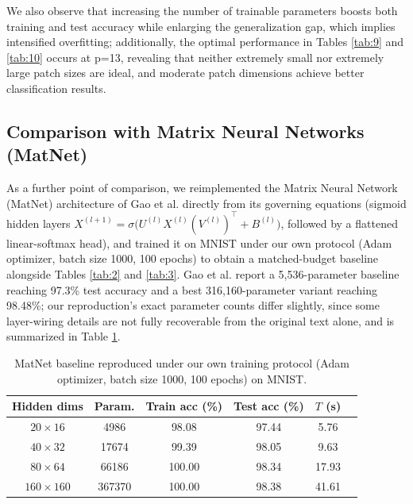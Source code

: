 \documentclass[pdflatex,sn-mathphys-num]{sn-jnl}%
\theoremstyle{thmstyleone}%
\theoremstyle{thmstyletwo}%
\theoremstyle{thmstylethree}%
\begin{document}
We also observe that increasing the number of trainable parameters boosts both training and test accuracy while enlarging the generalization gap, which implies intensified overfitting; additionally, the optimal performance in Tables \ref{tab:9} and \ref{tab:10} occurs at p=13, revealing that neither extremely small nor extremely large patch sizes are ideal, and moderate patch dimensions achieve better classification results.




\subsection{Comparison with Matrix Neural Networks (MatNet)}
As a further point of comparison, we reimplemented the Matrix Neural Network (MatNet) architecture of Gao et al. \cite{Gao2017MatNet} directly from its governing equations (sigmoid hidden layers $X^{(l+1)}=\sigma\big(U^{(l)}X^{(l)}(V^{(l)})^\top+B^{(l)}\big)$, followed by a flattened linear-softmax head), and trained it on MNIST under our own protocol (Adam optimizer, batch size 1000, 100 epochs) to obtain a matched-budget baseline alongside Tables \ref{tab:2} and \ref{tab:3}. Gao et al. report a 5,536-parameter baseline reaching 97.3\% test accuracy and a best 316,160-parameter variant reaching 98.48\%; our reproduction's exact parameter counts differ slightly, since some layer-wiring details are not fully recoverable from the original text alone, and is summarized in Table \ref{tab:matnet}.

\begin{table}[htbp]
\centering
\caption{MatNet \cite{Gao2017MatNet} baseline reproduced under our own training protocol (Adam optimizer, batch size 1000, 100 epochs) on MNIST.}
\label{tab:matnet}
\begin{tabular}{cccccc}
\toprule
Hidden dims & Param. & Train acc (\%) & Test acc (\%) & $T$ (s) \\
\midrule
$20\times16$   & 4986   & 98.08  & 97.44 & 5.76 \\
$40\times32$   & 17674  & 99.39  & 98.05 & 9.63 \\
$80\times64$   & 66186  & 100.00 & 98.34 & 17.93 \\
$160\times160$ & 367370 & 100.00 & 98.38 & 41.61 \\
\bottomrule
\end{tabular}
\end{table}
\end{document}
